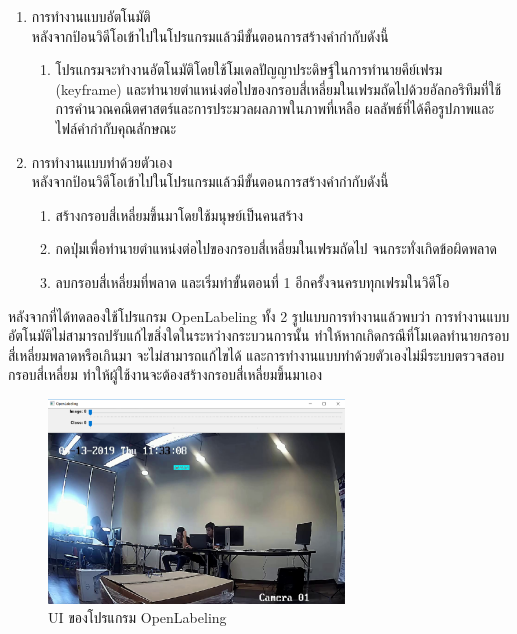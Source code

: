 \begin{enumerate}
	\setlength\itemsep{-0.25em}
	\item การทำงานแบบอัตโนมัติ 
	\\ หลังจากป้อนวิดีโอเข้าไปในโปรแกรมแล้วมีขั้นตอนการสร้างคำกำกับดังนี้ 
   	\begin{enumerate}
	\setlength\itemsep{-0.25em}
		\item โปรแกรมจะทำงานอัตโนมัติโดยใช้โมเดลปัญญาประดิษฐ์ในการทำนายคีย์เฟรม (keyframe) 
		และทำนายตำแหน่งต่อไปของกรอบสี่เหลี่ยมในเฟรมถัดไปด้วยอัลกอริทึมที่ใช้การคำนวณคณิตศาสตร์และการประมวลผลภาพในภาพที่เหลือ ผลลัพธ์ที่ได้คือรูปภาพและไฟล์คำกำกับคุณลักษณะ
 	\end{enumerate}
	\item การทำงานแบบทำด้วยตัวเอง 
	\\ หลังจากป้อนวิดีโอเข้าไปในโปรแกรมแล้วมีขั้นตอนการสร้างคำกำกับดังนี้ 
	\begin{enumerate}
	\setlength\itemsep{-0.25em}
		\item สร้างกรอบสี่เหลี่ยมขึ้นมาโดยใช้มนุษย์เป็นคนสร้าง
		\item กดปุ่มเพื่อทำนายตำแหน่งต่อไปของกรอบสี่เหลี่ยมในเฟรมถัดไป จนกระทั่งเกิดข้อผิดพลาด
		\item ลบกรอบสี่เหลี่ยมที่พลาด และเริ่มทำขั้นตอนที่ 1 อีกครั้งจนครบทุกเฟรมในวิดีโอ
 	\end{enumerate}
 \end{enumerate}
หลังจากที่ได้ทดลองใช้โปรแกรม OpenLabeling ทั้ง 2 รูปแบบการทำงานแล้วพบว่า การทำงานแบบอัตโนมัติไม่สามารถปรับแก้ไขสิ่งใดในระหว่างกระบวนการนั้น 
ทำให้หากเกิดกรณีที่โมเดลทำนายกรอบสี่เหลี่ยมพลาดหรือเกินมา จะไม่สามารถแก้ไขได้ และการทำงานแบบทำด้วยตัวเองไม่มีระบบตรวจสอบกรอบสี่เหลี่ยม ทำให้ผู้ใช้งานจะต้องสร้างกรอบสี่เหลี่ยมขึ้นมาเอง

\begin{figure}[!ht]
	\centering
	\includegraphics[width=0.7\textwidth]{chapter2/images/openlabel.png}
		\caption{UI ของโปรแกรม OpenLabeling}
    	\label{fig:openlabel}
\end{figure}


